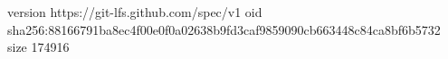 version https://git-lfs.github.com/spec/v1
oid sha256:88166791ba8ec4f00e0f0a02638b9fd3caf9859090cb663448c84ca8bf6b5732
size 174916
